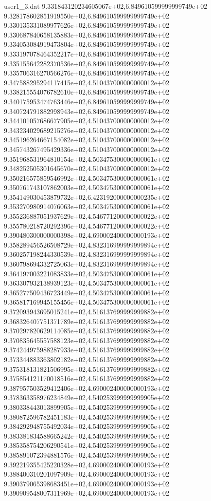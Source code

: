 \begin{filecontents}{user1_3.dat}
9.331843120234605067e+02,6.849610599999999749e+02
9.328178602851919550e+02,6.849610599999999749e+02
9.330135331089977626e+02,6.849610599999999749e+02
9.330687840658135883e+02,6.849610599999999749e+02
9.334053084919473804e+02,6.849610599999999749e+02
9.333197078464352217e+02,6.849610599999999749e+02
9.335155642282370536e+02,6.849610599999999749e+02
9.335706316270566276e+02,6.849610599999999749e+02
9.347588295294117415e+02,4.510437000000000012e+02
9.338215554076782610e+02,6.849610599999999749e+02
9.340175953474763446e+02,6.849610599999999749e+02
9.340724791882998943e+02,6.849610599999999749e+02
9.344101057686677905e+02,4.510437000000000012e+02
9.343234029689215276e+02,4.510437000000000012e+02
9.345196264667154082e+02,4.510437000000000012e+02
9.345743267495429336e+02,4.510437000000000012e+02
9.351968531964810154e+02,4.503475300000000061e+02
9.348252505301645670e+02,4.510437000000000012e+02
9.350216575859546992e+02,4.503475300000000061e+02
9.350761743107862003e+02,4.503475300000000061e+02
9.354149030453879732e+02,6.423192000000000235e+02
9.353270980914076063e+02,4.503475300000000061e+02
9.355236887051937629e+02,4.546771200000000022e+02
9.355780218720292396e+02,4.546771200000000022e+02
9.390480300000000398e+02,4.690002400000000193e+02
9.358289456526508729e+02,4.832316999999999894e+02
9.360257198244330539e+02,4.832316999999999894e+02
9.360798694332725063e+02,4.832316999999999894e+02
9.364197003221083833e+02,4.503475300000000061e+02
9.363307932138939123e+02,4.503475300000000061e+02
9.365277509436723449e+02,4.503475300000000061e+02
9.365817169945155456e+02,4.503475300000000061e+02
9.372093943695015241e+02,4.516137699999999882e+02
9.368326407751371789e+02,4.516137699999999882e+02
9.370297820629114085e+02,4.516137699999999882e+02
9.370835645557588123e+02,4.516137699999999882e+02
9.374244975988287933e+02,4.516137699999999882e+02
9.373344883363802182e+02,4.516137699999999882e+02
9.375318131821506995e+02,4.516137699999999882e+02
9.375854121170018516e+02,4.516137699999999882e+02
9.387957503529412406e+02,4.690002400000000193e+02
9.378363358976234849e+02,4.540253999999999905e+02
9.380338443013899905e+02,4.540253999999999905e+02
9.380872596782451183e+02,4.540253999999999905e+02
9.384292948755492034e+02,4.540253999999999905e+02
9.383381834588665242e+02,4.540253999999999905e+02
9.385358754206290541e+02,4.540253999999999905e+02
9.385891072394881576e+02,4.540253999999999905e+02
9.392219355425220328e+02,4.690002400000000193e+02
9.388400310201097909e+02,4.690002400000000193e+02
9.390379065398683451e+02,4.690002400000000193e+02
9.390909548007311969e+02,4.690002400000000193e+02

\end{filecontents}
